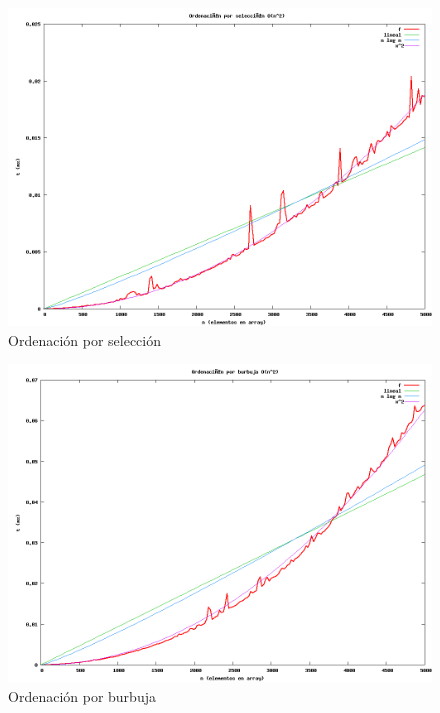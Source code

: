\documentclass[11pt]{article}
\begin{document}
\begin{figure}
  \centering
    \includegraphics[width=1.0\textwidth]{selection-sort.png}
  \caption{Ordenación por selección}
  \label{fig:selection}
\end{figure}

\begin{figure}
  \centering
    \includegraphics[width=1.0\textwidth]{bubble-sort.png}
  \caption{Ordenación por burbuja}
  \label{fig:bubble}
\end{figure}
\end{document}
